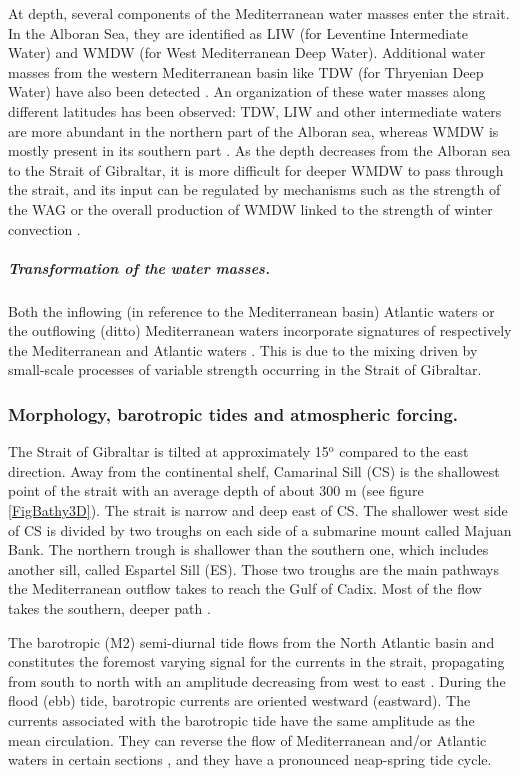 At depth, several components of the Mediterranean water masses enter the strait. In the Alboran Sea, they are identified as LIW (for Leventine Intermediate Water) and WMDW (for West Mediterranean Deep Water).  Additional water masses from the western Mediterranean basin like TDW (for Thryenian Deep Water) have also been detected \citep{Millot2014}. An organization of these water masses along different latitudes has been observed: TDW, LIW and other intermediate waters are more abundant in the northern part of the Alboran sea, whereas WMDW is mostly present in its southern part \citep{Millot2014}. As the depth decreases from the Alboran sea to the Strait of Gibraltar, it is more difficult for deeper WMDW to pass through the strait, and its input can be regulated by mechanisms such as the strength of the WAG or the overall production of WMDW linked to the strength of winter convection \citep{naranjo_2012}.

\subparagraph{Transformation of the water masses.}
Both the inflowing (in reference to the Mediterranean basin) Atlantic waters or the outflowing (ditto) Mediterranean waters incorporate signatures of respectively the Mediterranean \citep{macias_2006} and Atlantic waters \citep{millot_2007,GarciaLafuente2011}. This is due to the mixing driven by small-scale processes of variable strength occurring in the Strait of Gibraltar.  


\subsubsection{Morphology, barotropic tides and atmospheric forcing.} 


The Strait of Gibraltar is tilted at approximately 15$^\text{o}$ compared to the east direction. Away from the continental shelf, Camarinal Sill (CS) is the shallowest point of the strait with an average depth of about 300 m (see figure \ref{FigBathy3D}). The strait is narrow and deep east of CS. The shallower west side of CS is divided by two troughs on each side of a submarine mount called Majuan Bank. The northern trough is shallower than the southern one, which includes another sill, called Espartel Sill (ES). Those two troughs are the main pathways the Mediterranean outflow takes to reach the Gulf of Cadix. Most of the flow takes the southern, deeper path \citep{SN2015}.

The barotropic (M2) semi-diurnal tide flows from the North Atlantic basin and constitutes the foremost varying signal for the currents in the strait, propagating from south to north with an amplitude decreasing from west to east \citep{CW90}. During the flood (ebb) tide, barotropic currents are oriented westward (eastward). The currents associated with the barotropic tide have the same amplitude as the mean circulation. They can reverse the flow of Mediterranean and/or Atlantic waters in certain sections \citep{sanchez-roman_2012}, and they have a pronounced neap-spring tide cycle.

